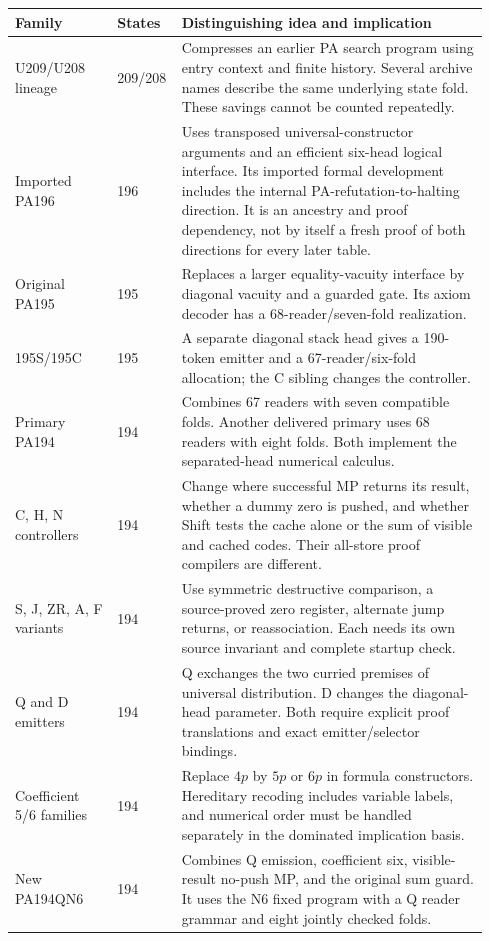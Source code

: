 \documentclass[11pt,letterpaper]{article}
\begin{document}
\begin{longtable}{@{}p{0.21\linewidth}p{0.10\linewidth}p{0.63\linewidth}@{}}
\toprule Family & States & Distinguishing idea and implication\\\midrule\endhead
U209/U208 lineage &209/208& Compresses an earlier PA search program using entry context and finite history. Several archive names describe the same underlying state fold. These savings cannot be counted repeatedly.\\[5pt]
Imported PA196 &196& Uses transposed universal-constructor arguments and an efficient six-head logical interface. Its imported formal development includes the internal PA-refutation-to-halting direction. It is an ancestry and proof dependency, not by itself a fresh proof of both directions for every later table.\\[5pt]
Original PA195 &195& Replaces a larger equality-vacuity interface by diagonal vacuity and a guarded gate. Its axiom decoder has a 68-reader/seven-fold realization.\\[5pt]
195S/195C &195& A separate diagonal stack head gives a 190-token emitter and a 67-reader/six-fold allocation; the C sibling changes the controller.\\[5pt]
Primary PA194 &194& Combines 67 readers with seven compatible folds. Another delivered primary uses 68 readers with eight folds. Both implement the separated-head numerical calculus.\\[5pt]
C, H, N controllers &194& Change where successful MP returns its result, whether a dummy zero is pushed, and whether Shift tests the cache alone or the sum of visible and cached codes. Their all-store proof compilers are different.\\[5pt]
S, J, ZR, A, F variants &194& Use symmetric destructive comparison, a source-proved zero register, alternate jump returns, or reassociation. Each needs its own source invariant and complete startup check.\\[5pt]
Q and D emitters &194& Q exchanges the two curried premises of universal distribution. D changes the diagonal-head parameter. Both require explicit proof translations and exact emitter/selector bindings.\\[5pt]
Coefficient 5/6 families &194& Replace $4p$ by $5p$ or $6p$ in formula constructors. Hereditary recoding includes variable labels, and numerical order must be handled separately in the dominated implication basis.\\[5pt]
New PA194QN6 &194& Combines Q emission, coefficient six, visible-result no-push MP, and the original sum guard. It uses the N6 fixed program with a Q reader grammar and eight jointly checked folds.\\
\bottomrule
\end{longtable}
\end{document}
